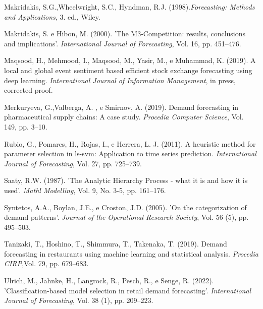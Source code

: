 \documentclass{book}
\begin{document}
\begin{thebibliography}{12}
Makridakis, S.G.,Wheelwright, S.C., Hyndman, R.J. (1998).{\it Forecasting: Methods and Applications}, 3. ed., Wiley.

Makridakis, S. e Hibon, M. (2000). 'The M3-Competition: results, conclusions and implications'. {\it International Journal of Forecasting}, Vol. 16, pp. 451--476.

Maqsood, H., Mehmood, I., Maqsood, M., Yasir, M., e Muhammad, K. (2019). A local and global event sentiment based efficient stock exchange forecasting using deep learning. {\it International Journal of Information Management}, in
press, corrected proof.

Merkuryeva, G.,Valberga,  A. , e Smirnov, A. (2019). Demand forecasting in pharmaceutical supply chains: A case study. {\it Procedia Computer Science}, Vol. 149, pp. 3--10.

Rubio, G., Pomares, H., Rojas, I., e Herrera, L. J. (2011). A heuristic method for parameter selection in ls-svm: Application to time series prediction. {\it International Journal of Forecasting}, Vol. 27, pp. 725--739.

Saaty, R.W. (1987). 'The Analytic Hierarchy Process - what it is and how it is used'. {\it Mathl Modelling}, Vol. 9, No. 3-5, pp. 161--176.

Syntetos, A.A., Boylan, J.E., e Croston, J.D. (2005). 'On the categorization of demand patterns'. {\it Journal of the Operational Research Society}, Vol. 56 (5), pp. 495--503.

Tanizaki, T., Hoshino, T., Shimmura, T., Takenaka, T. (2019). Demand forecasting in restaurants using machine learning and statistical analysis. {\it Procedia CIRP},Vol. 79, pp. 679--683.

Ulrich, M., Jahnke, H., Langrock, R., Pesch, R., e Senge, R. (2022). 'Classification-based model selection in retail demand forecasting'. {\it International Journal of Forecasting}, Vol. 38 (1), pp. 209--223.


\end{thebibliography}
\end{document}

